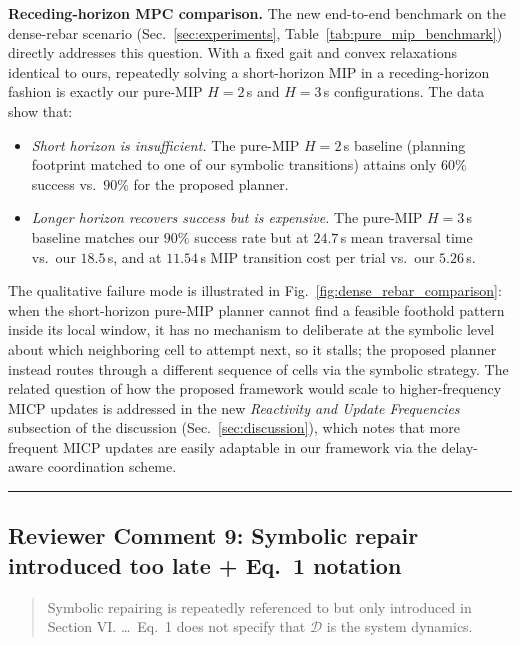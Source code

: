 \noindent \textbf{Receding-horizon MPC comparison.} The new end-to-end benchmark on the dense-rebar scenario (Sec.~\ref{sec:experiments}, Table~\ref{tab:pure_mip_benchmark}) directly addresses this question. With a fixed gait and convex relaxations identical to ours, repeatedly solving a short-horizon MIP in a receding-horizon fashion is exactly our pure-MIP $H{=}2$\,s and $H{=}3$\,s configurations. The data show that:
\begin{itemize}
    \item \textit{Short horizon is insufficient.} The pure-MIP $H{=}2$\,s baseline (planning footprint matched to one of our symbolic transitions) attains only $60\%$ success vs.\ $90\%$ for the proposed planner.
    \item \textit{Longer horizon recovers success but is expensive.} The pure-MIP $H{=}3$\,s baseline matches our $90\%$ success rate but at $24.7$\,s mean traversal time vs.\ our $18.5$\,s, and at $11.54$\,s MIP transition cost per trial vs.\ our $5.26$\,s.
\end{itemize}
The qualitative failure mode is illustrated in Fig.~\ref{fig:dense_rebar_comparison}: when the short-horizon pure-MIP planner cannot find a feasible foothold pattern inside its local window, it has no mechanism to deliberate at the symbolic level about which neighboring cell to attempt next, so it stalls; the proposed planner instead routes through a different sequence of cells via the symbolic strategy. The related question of how the proposed framework would scale to higher-frequency MICP updates is addressed in the new \textit{Reactivity and Update Frequencies} subsection of the discussion (Sec.~\ref{sec:discussion}), which notes that more frequent MICP updates are easily adaptable in our framework via the delay-aware coordination scheme.

\noindent\rule{17cm}{2.0pt}

\subsection{Reviewer Comment 9: Symbolic repair introduced too late + Eq.~1 notation}
\begin{mdframed}
\begin{quote}
Symbolic repairing is repeatedly referenced to but only introduced in Section VI. \ldots\ Eq.~1 does not specify that $\mathcal{D}$ is the system dynamics.
\end{quote}
\end{mdframed}

